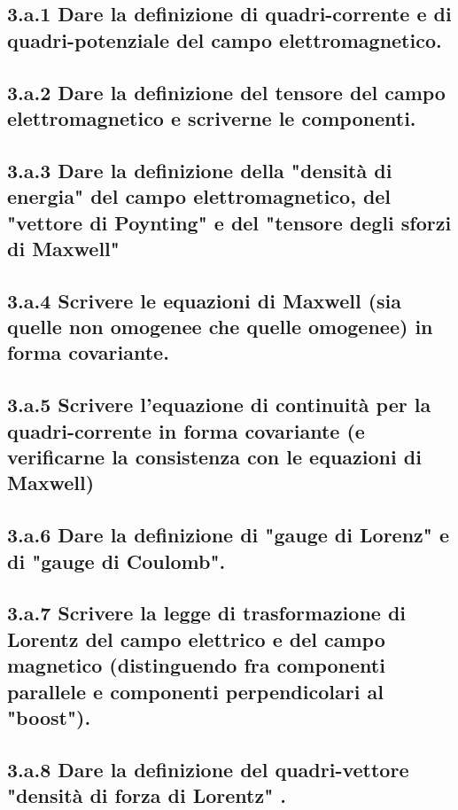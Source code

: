 \subsection*{3.a.1 Dare la definizione di quadri-corrente e di quadri-potenziale del campo elettromagnetico.}

\subsection*{3.a.2 Dare la definizione del tensore del campo elettromagnetico e scriverne le componenti.}

\subsection*{3.a.3 Dare la definizione della "densità di energia" del campo elettromagnetico, del "vettore di Poynting" e del "tensore degli sforzi di Maxwell"}

\subsection*{3.a.4 Scrivere le equazioni di Maxwell (sia quelle non omogenee che quelle omogenee) in forma covariante.}

\subsection*{3.a.5 Scrivere l'equazione di continuità per la quadri-corrente in forma covariante (e verificarne la consistenza con le equazioni di Maxwell)}

\subsection*{3.a.6 Dare la definizione di "gauge di Lorenz" e di "gauge di Coulomb".}

\subsection*{3.a.7 Scrivere la legge di trasformazione di Lorentz del campo elettrico e del campo magnetico (distinguendo fra componenti parallele e componenti perpendicolari al "boost").}

\subsection*{3.a.8 Dare la definizione del quadri-vettore "densità di forza di Lorentz" .}

